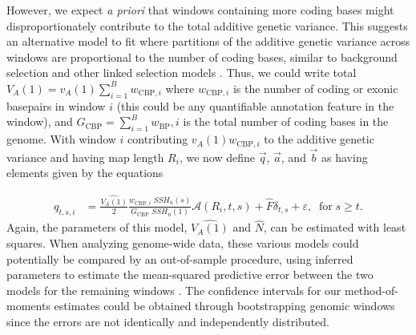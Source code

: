 \documentclass[11pt]{article}
\begin{document}
However, we expect \emph{a priori} that windows containing more coding bases
might disproportionately contribute to the total additive genetic variance.
This suggests an alternative model to fit where partitions of the additive
genetic variance across windows are proportional to the number of coding bases,
similar to background selection and other linked selection models
\parencite{Rockman2010-bw,McVicker2009-ax,Corbett-Detig2015-gt}. Thus, we could
write total $V_A(1) = v_A(1) \sum_{i=1}^B w_{\text{CBP},i}$ where
$w_{\text{CBP},i}$ is the number of coding or exonic basepairs in window $i$
(this could be any quantifiable annotation feature in the window), and
$G_\text{CBP} = \sum_{i=1}^B w_{\textrm{BP}},i$ is the total number of coding
bases in the genome. With window $i$ contributing $v_A(1) w_{\text{CBP}, i}$ to the
additive genetic variance and having map length $R_i$, we now define $\vec{q}$,
$\vec{a}$, and $\vec{b}$ as having elements given by the equations

\begin{align} 
  \label{eq:va-bp}
  q_{t,s,i} &= \frac{\widehat{V_A(1)}}{2} \frac{w_{\text{CBP},i} \; SSH_n(s)}{G_{\text{CBP}} \; SSH_n(1)} \mathcal{A} (R_i, t, s) + \widehat{F} \delta_{t,s} + \varepsilon, \;\; \text{for} \; s \ge t.
\end{align}
%
Again, the parameters of this model, $\widehat{V_A(1)}$ and $\widehat{N}$, can
be estimated with least squares. When analyzing genome-wide data, these various
models could potentially be compared by an out-of-sample procedure, using
inferred parameters to estimate the mean-squared predictive error between the
two models for the remaining windows \parencite{Elyashiv2016-vt}. The
confidence intervals for our method-of-moments estimates could be obtained
through bootstrapping genomic windows since the errors are not identically and
independently distributed.

\end{document}
